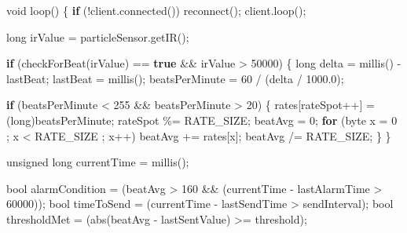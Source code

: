 \documentclass[11pt]{article}
\newenvironment{Shaded}{}{}
\newcommand{\KeywordTok}[1]{\textcolor[rgb]{0.00,0.44,0.13}{\textbf{{#1}}}}
\newcommand{\DataTypeTok}[1]{\textcolor[rgb]{0.56,0.13,0.00}{{#1}}}
\newcommand{\DecValTok}[1]{\textcolor[rgb]{0.25,0.63,0.44}{{#1}}}
\newcommand{\FloatTok}[1]{\textcolor[rgb]{0.25,0.63,0.44}{{#1}}}
\newcommand{\NormalTok}[1]{{#1}}
\newcommand{\ControlFlowTok}[1]{\textcolor[rgb]{0.00,0.44,0.13}{\textbf{{#1}}}}
\newcommand{\OperatorTok}[1]{\textcolor[rgb]{0.40,0.40,0.40}{{#1}}}
\begin{document}
\begin{Shaded}
\begin{Highlighting}[]
\DataTypeTok{void}\NormalTok{ loop}\OperatorTok{()} \OperatorTok{\{}
  \ControlFlowTok{if} \OperatorTok{(!}\NormalTok{client}\OperatorTok{.}\NormalTok{connected}\OperatorTok{())}\NormalTok{ reconnect}\OperatorTok{();}
\NormalTok{  client}\OperatorTok{.}\NormalTok{loop}\OperatorTok{();}

  \DataTypeTok{long}\NormalTok{ irValue }\OperatorTok{=}\NormalTok{ particleSensor}\OperatorTok{.}\NormalTok{getIR}\OperatorTok{();}

  \ControlFlowTok{if} \OperatorTok{(}\NormalTok{checkForBeat}\OperatorTok{(}\NormalTok{irValue}\OperatorTok{)} \OperatorTok{==} \KeywordTok{true} \OperatorTok{\&\&}\NormalTok{ irValue }\OperatorTok{\textgreater{}} \DecValTok{50000}\OperatorTok{)} \OperatorTok{\{}
    \DataTypeTok{long}\NormalTok{ delta }\OperatorTok{=}\NormalTok{ millis}\OperatorTok{()} \OperatorTok{{-}}\NormalTok{ lastBeat}\OperatorTok{;}
\NormalTok{    lastBeat }\OperatorTok{=}\NormalTok{ millis}\OperatorTok{();}
\NormalTok{    beatsPerMinute }\OperatorTok{=} \DecValTok{60} \OperatorTok{/} \OperatorTok{(}\NormalTok{delta }\OperatorTok{/} \FloatTok{1000.0}\OperatorTok{);}

    \ControlFlowTok{if} \OperatorTok{(}\NormalTok{beatsPerMinute }\OperatorTok{\textless{}} \DecValTok{255} \OperatorTok{\&\&}\NormalTok{ beatsPerMinute }\OperatorTok{\textgreater{}} \DecValTok{20}\OperatorTok{)} \OperatorTok{\{}
\NormalTok{      rates}\OperatorTok{[}\NormalTok{rateSpot}\OperatorTok{++]} \OperatorTok{=} \OperatorTok{(}\DataTypeTok{long}\OperatorTok{)}\NormalTok{beatsPerMinute}\OperatorTok{;}
\NormalTok{      rateSpot }\OperatorTok{\%=}\NormalTok{ RATE\_SIZE}\OperatorTok{;}
\NormalTok{      beatAvg }\OperatorTok{=} \DecValTok{0}\OperatorTok{;}
      \ControlFlowTok{for} \OperatorTok{(}\NormalTok{byte x }\OperatorTok{=} \DecValTok{0} \OperatorTok{;}\NormalTok{ x }\OperatorTok{\textless{}}\NormalTok{ RATE\_SIZE }\OperatorTok{;}\NormalTok{ x}\OperatorTok{++)}\NormalTok{ beatAvg }\OperatorTok{+=}\NormalTok{ rates}\OperatorTok{[}\NormalTok{x}\OperatorTok{];}
\NormalTok{      beatAvg }\OperatorTok{/=}\NormalTok{ RATE\_SIZE}\OperatorTok{;}
    \OperatorTok{\}}
  \OperatorTok{\}}

  \DataTypeTok{unsigned} \DataTypeTok{long}\NormalTok{ currentTime }\OperatorTok{=}\NormalTok{ millis}\OperatorTok{();}

  \DataTypeTok{bool}\NormalTok{ alarmCondition }\OperatorTok{=} \OperatorTok{(}\NormalTok{beatAvg }\OperatorTok{\textgreater{}} \DecValTok{160} \OperatorTok{\&\&} \OperatorTok{(}\NormalTok{currentTime }\OperatorTok{{-}}\NormalTok{ lastAlarmTime }\OperatorTok{\textgreater{}} \DecValTok{60000}\OperatorTok{));}
  \DataTypeTok{bool}\NormalTok{ timeToSend }\OperatorTok{=} \OperatorTok{(}\NormalTok{currentTime }\OperatorTok{{-}}\NormalTok{ lastSendTime }\OperatorTok{\textgreater{}}\NormalTok{ sendInterval}\OperatorTok{);}
  \DataTypeTok{bool}\NormalTok{ thresholdMet }\OperatorTok{=} \OperatorTok{(}\NormalTok{abs}\OperatorTok{(}\NormalTok{beatAvg }\OperatorTok{{-}}\NormalTok{ lastSentValue}\OperatorTok{)} \OperatorTok{\textgreater{}=}\NormalTok{ threshold}\OperatorTok{);}


\end{Highlighting}
\end{Shaded}
\end{document}
